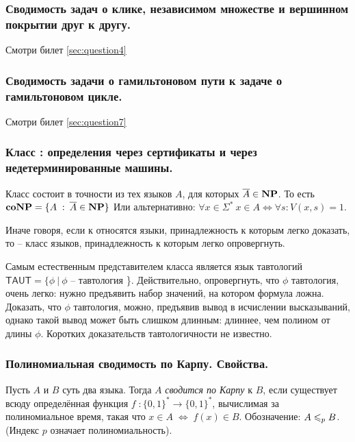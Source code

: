 \subsubsection{Сводимость задач о клике, независимом множестве и вершинном покрытии друг к другу.}
Смотри билет \ref{sec:question4}

\subsubsection{Сводимость задачи о гамильтоновом пути к задаче о гамильтоновом цикле.}
Смотри билет \ref{sec:question7}

\subsubsection{Класс \conp : определения через сертификаты и через недетерминированные машины.}

\begin{definition}
Класс \conp состоит в точности из тех языков $A$, для которых $\overline{A} \in \textbf{NP}$. \newline То есть $\textbf{coNP} = \{A \; : \: \overline{A} \in \textbf{NP}\}$
\newline Или альтернативно: $\forall x \in \Sigma^* \ x \in A \Longleftrightarrow \forall s: V(x, s) = 1.
$ 
\end{definition}

Иначе говоря, если к \np
относятся языки, принадлежность к которым легко доказать, то \conp -- класс языков, принадлежность к которым легко опровергнуть.

\begin{example}
Самым естественным представителем класса
\conp является язык
тавтологий $\mathsf{TAUT} = \{\phi\ | \ \phi$ -- тавтология \}.  Действительно, опровергнуть, что $\phi$
тавтология, очень легко: нужно предъявить набор значений, на котором формула ложна. Доказать, что $\phi$
тавтология, можно, предъявив вывод в исчислении высказываний, однако такой вывод может быть слишком длинным: длиннее,
чем полином от длины $\phi$. Коротких доказательств тавтологичности не известно.
\end{example}

\subsubsection{Полиномиальная сводимость по Карпу. Свойства.}
\begin{definition}
Пусть $A$ и $B$ суть два языка. Тогда
$A$ \textit{сводится по Карпу}
к $B$, если существует всюду определённая функция $f \; : \{0, 1\}^* \to \{0, 1\}^*$, вычислимая за полиномиальное время, такая что
$x\in A \; \Leftrightarrow \; f(x)\in B$. Обозначение: $A \leqslant_p B$. (Индекс $p$
означает полиномиальность).
\end{definition}

